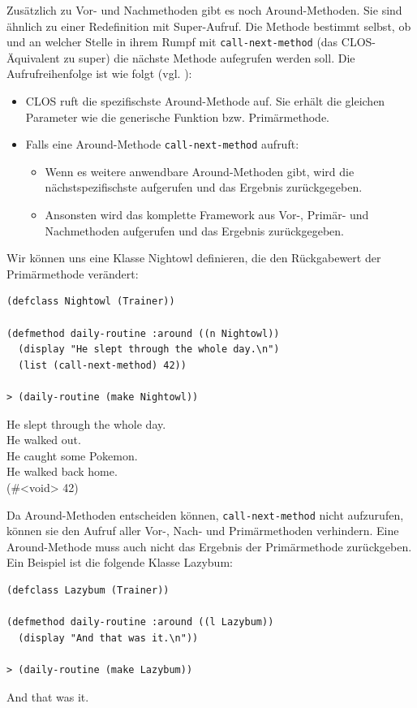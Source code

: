 Zusätzlich zu Vor- und Nachmethoden gibt es noch Around-Methoden. Sie sind ähnlich zu einer Redefinition mit Super-Aufruf. Die Methode bestimmt selbst, ob und an welcher Stelle in ihrem Rumpf mit \texttt{call-next-method} (das CLOS-Äquivalent zu super) die nächste Methode aufegrufen werden soll. Die Aufrufreihenfolge ist wie folgt (vgl. \cite[S.103]{keene}):
\begin{itemize}
 \item CLOS ruft die spezifischste Around-Methode auf. Sie erhält die gleichen Parameter wie die generische Funktion bzw. Primärmethode.
 \item Falls eine Around-Methode \texttt{call-next-method} aufruft:
 \begin{itemize}
  \item Wenn es weitere anwendbare Around-Methoden gibt, wird die nächstspezifischste aufgerufen und das Ergebnis zurückgegeben.
  \item Ansonsten wird das komplette Framework aus Vor-, Primär- und Nachmethoden aufgerufen und das Ergebnis zurückgegeben.
 \end{itemize}
\end{itemize}

Wir können uns eine Klasse Nightowl definieren, die den Rückgabewert der Primärmethode verändert:

\begin{lstlisting}
(defclass Nightowl (Trainer))

(defmethod daily-routine :around ((n Nightowl))
  (display "He slept through the whole day.\n")
  (list (call-next-method) 42))
  
> (daily-routine (make Nightowl))
\end{lstlisting}
{\routput He slept through the whole day.\\
\phantom{.}He walked out.\\
\phantom{.}He caught some Pokemon.\\
\phantom{.}He walked back home.\\
\phantom{.}(\#<void> 42)}

Da Around-Methoden entscheiden können, \texttt{call-next-method} nicht aufzurufen, können sie den Aufruf aller Vor-, Nach- und Primärmethoden verhindern. Eine Around-Methode muss auch nicht das Ergebnis der Primärmethode zurückgeben. Ein Beispiel ist die folgende Klasse Lazybum:

\begin{lstlisting}
(defclass Lazybum (Trainer))

(defmethod daily-routine :around ((l Lazybum))
  (display "And that was it.\n"))
  
> (daily-routine (make Lazybum))
\end{lstlisting}
{\routput And that was it.}

